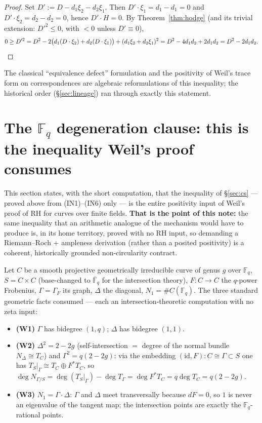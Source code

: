 \documentclass[11pt]{article}
\theoremstyle{definition}
\theoremstyle{remark}
\newcommand{\Fq}{\mathbb{F}_q}
\begin{document}
\begin{proof}
Set $D' := D - d_1 \xi_2 - d_2 \xi_1$. Then $D' \cdot \xi_1 = d_1 - d_1 = 0$ and
$D' \cdot \xi_2 = d_2 - d_2 = 0$, hence $D' \cdot H = 0$. By Theorem~\ref{thm:hodge} (and
its trivial extension: $D'^2 \le 0$, with $< 0$ unless $D' \equiv 0$),
\[
0 \ge D'^2
= D^2 - 2\bigl(d_1 (D \cdot \xi_2) + d_2 (D \cdot \xi_1)\bigr)
  + (d_1 \xi_2 + d_2 \xi_1)^2
= D^2 - 4 d_1 d_2 + 2 d_1 d_2
= D^2 - 2 d_1 d_2. \qedhere
\]
\end{proof}

The classical ``equivalence defect'' formulation and the positivity of Weil's trace form on
correspondences are algebraic reformulations of this inequality; the historical order
(\S\ref{sec:lineage}) ran through exactly this statement.

\section{The \texorpdfstring{$\mathbb{F}_q$}{Fq} degeneration clause: this is the
inequality Weil's proof consumes}
\label{sec:degeneration}

This section states, with the short computation, that the inequality of \S\ref{sec:cs} ---
proved above from (IN1)--(IN6) only --- is the entire positivity input of Weil's proof of RH
for curves over finite fields. \textbf{That is the point of this note:} the same inequality
that an arithmetic analogue of the mechanism would have to produce is, in its home
territory, proved with no RH input, so demanding a Riemann--Roch + ampleness derivation
(rather than a posited positivity) is a coherent, historically grounded non-circularity
contract.

Let $C$ be a smooth projective geometrically irreducible curve of genus $g$ over $\Fq$,
$S = C \times C$ (base-changed to $\overline{\mathbb{F}}_q$ for the intersection theory),
$F\colon C \to C$ the $q$-power Frobenius, $\Gamma = \Gamma_F$ its graph, $\Delta$ the
diagonal, $N_1 = \#C(\Fq)$. The three standard geometric facts consumed --- each an
intersection-theoretic computation with no zeta input:

\begin{itemize}
\item \textbf{(W1)} $\Gamma$ has bidegree $(1, q)$; $\Delta$ has bidegree $(1, 1)$.
\item \textbf{(W2)} $\Delta^2 = 2 - 2g$ (self-intersection $=$ degree of the normal bundle
  $N_{\Delta} \cong T_C$) and $\Gamma^2 = q(2 - 2g)$: via the embedding
  $(\mathrm{id}, F)\colon C \cong \Gamma \subset S$ one has
  $T_S|_{\Gamma} \cong T_C \oplus F^* T_C$, so
  $\deg N_{\Gamma/S} = \deg(T_S|_{\Gamma}) - \deg T_{\Gamma} = \deg F^* T_C
  = q \deg T_C = q(2 - 2g)$.
\item \textbf{(W3)} $N_1 = \Gamma \cdot \Delta$: $\Gamma$ and $\Delta$ meet transversally
  because $dF = 0$, so $1$ is never an eigenvalue of the tangent map; the intersection
  points are exactly the $\Fq$-rational points.
\end{itemize}
\end{document}

